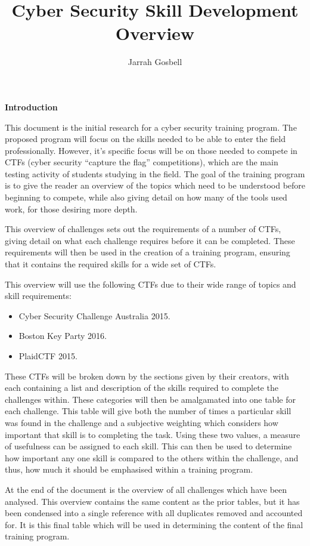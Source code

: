 \documentclass[a4paper,11pt]{report}
\author{Jarrah Gosbell}
\title{Cyber Security Skill Development Overview}
\makeatletter
\newcommand\frontmatter{%
    \cleardoublepage
  \pagenumbering{roman}}
\newcommand\mainmatter{%
    \cleardoublepage
  \pagenumbering{arabic}}
\newenvironment{multipleabstract}[1]
  {\renewcommand{\abstractname}{#1}\newpage\begin{abstract}\thispagestyle{plain}}
  {\end{abstract}}
\renewenvironment{abstract}{%
    \begin{center}%
      {\bfseries \vspace{5em}\abstractname\vspace{.5em}\vspace{\z@}}%
    \end{center}%
}
\makeatother
\begin{document}
\frontmatter
\maketitle
\tableofcontents
	\listoftables
\begin{multipleabstract}{Introduction}
	This document is the initial research for a cyber security training program. 
	The proposed program will focus on the skills needed to be able to enter the field professionally.
	However, it's specific focus will be on those needed to compete in CTFs (cyber security ``capture the flag'' competitions), 
	which are the main testing activity of students studying in the field. 
	The goal of the training program is to give the reader an overview of the topics which need to be understood before beginning to compete, 
	while also giving detail on how many of the tools used work, for those desiring more depth. 

	This overview of challenges sets out the requirements of a number of CTFs, 
	giving detail on what each challenge requires before it can be completed. 
	These requirements will then be used in the creation of a training program, 
	ensuring that it contains the required skills for a wide set of CTFs. 

	This overview will use the following CTFs due to their wide range of topics and skill requirements:
	\begin{itemize}
		\item Cyber Security Challenge Australia 2015.
		\item Boston Key Party 2016.
		\item PlaidCTF 2015.
	\end{itemize}
	These CTFs will be broken down by the sections given by their creators, 
	with each containing a list and description of the skills required to complete the challenges within. 
	These categories will then be amalgamated into one table for each challenge. 
	This table will give both the number of times a particular skill was found in the challenge and a subjective weighting which considers how important that skill is to completing the task. 
	Using these two values, a measure of usefulness can be assigned to each skill. 
	This can then be used to determine how important any one skill is compared to the others within the challenge, and thus, how much it should be emphasised within a training program.

	At the end of the document is the overview of all challenges which have been analysed. 
	This overview contains the same content as the prior tables, but it has been condensed into a single reference with all duplicates removed and accounted for. 
	It is this final table which will be used in determining the content of the final training program. 
\end{multipleabstract}
\mainmatter
\end{document}
